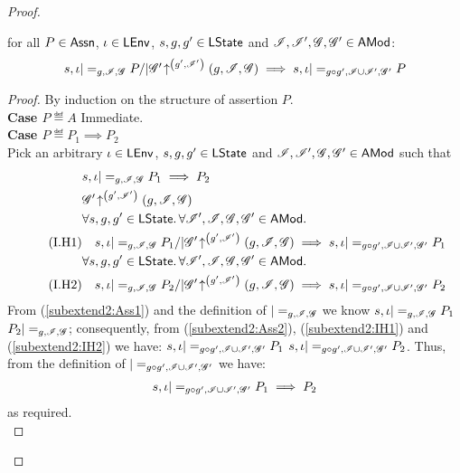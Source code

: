\begin{lemma}[Stability]
\begin{proof}
{\begin{lemma}[]
\end{lemma}
%
%
\begin{lemma}[]\label{lem:sub-stable-1}
for all $P \in \textsf{Assn}$, $\iota \in \textsf{LEnv}$, $s, g, g' \in \textsf{LState}$ and $\mathscr{I}, \mathscr{I}', \mathscr{G}, \mathscr{G}' \in \textsf{AMod}$: 
% 
\[
\begin{array}{@{} l @{}}
	s, \lenv |=_{g, \lmod, \gmod} P /| 
	\expandsAM{\gmod'}{g'}{\lmod'}{g}{\lmod}{\gmod}
	 \implies  s, \lenv |=_{g \composeL g', \lmod \cup \lmod', \gmod'} P
\end{array}
\]
%
\begin{proof}
By induction on the structure of assertion $P$.	\\

\noindent\textbf{Case $P \eqdef A$\quad} Immediate.\\
\noindent\textbf{Case $P \eqdef P_1 \implies P_2$} \\
Pick an arbitrary $\iota \in \textsf{LEnv}$, $s, g, g' \in \textsf{LState}$ and $\mathscr{I}, \mathscr{I}', \mathscr{G}, \mathscr{G}' \in \textsf{AMod}$ such that
%
\begin{align}
	& s, \lenv |=_{g, \lmod, \gmod} P_1 \implies P_2 \label{subextend2:Ass1}\\
%	
	&\expandsAM{\gmod'}{g'}{\lmod'}{g}{\lmod}{\gmod} \label{subextend2:Ass2}\\
%	
	& \for{s, g, g' \in \LStates} \for{\lmod', \lmod, \gmod, \gmod' \in \AMods} \nonumber\\
	\tag{I.H1} & 
	\quad s, \lenv |=_{g, \lmod, \gmod} P_1 /| \expandsAM{\gmod'}{g'}{\lmod'}{g}{\lmod}{\gmod} \implies s, \lenv |=_{g \composeL g', \lmod \cup \lmod', \gmod'} P_1 \label{subextend2:IH1}\\ 
%
	& \for{s, g, g' \in \LStates} \for{\lmod', \lmod, \gmod, \gmod' \in \AMods} \nonumber\\
	\tag{I.H2} & 
	\quad s, \lenv |=_{g, \lmod, \gmod} P_2 /| \expandsAM{\gmod'}{g'}{\lmod'}{g}{\lmod}{\gmod} \implies s, \lenv |=_{g \composeL g', \lmod \cup \lmod', \gmod'} P_2 \label{subextend2:IH2}
%	
\end{align}
%
From (\ref{subextend2:Ass1}) and the definition of $|=_{g, \mathscr{I}, \mathscr{G}}$ we know $s, \iota |=_{g, \mathscr{I}, \mathscr{G}} P_1$  $P_2 |=_{g, \mathscr{I}, \mathscr{G}}$; consequently, from (\ref{subextend2:Ass2}), (\ref{subextend2:IH1}) and (\ref{subextend2:IH2}) we have: $s, \iota |=_{g \circ g', \mathscr{I} \cup \mathscr{I}', \mathscr{G}'} P_1$  $s, \iota |=_{g \circ g', \mathscr{I} \cup \mathscr{I}', \mathscr{G}'} P_2$. Thus, from the definition of $|=_{g \circ g', \mathscr{I} \cup \mathscr{I}', \mathscr{G}'}$ we have:
%
\begin{align*}
	s, \iota |=_{g \circ g', \mathscr{I} \cup \mathscr{I}', \mathscr{G}'} P_1 \implies P_2
\end{align*}
%
as required.\\


\end{proof}
\end{lemma}}
\end{proof}
\end{lemma}
